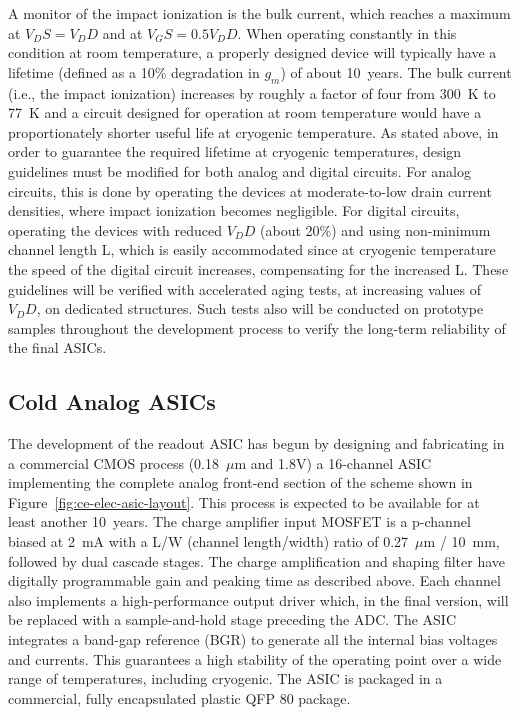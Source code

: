 A monitor of the impact ionization is the bulk current, which reaches a maximum at $V_DS = V_DD$ and at $V_GS = 0.5 V_DD$. 
When operating constantly in this condition at room temperature, a properly designed device 
will typically have a lifetime (defined as a 10\% degradation in $g_m$) of about 10~years. 
The bulk current (i.e., the impact ionization) increases by roughly a factor of four from 300~K to 77~K 
\cite{CMOS-reliability} and a circuit designed for operation at room temperature would have 
a proportionately shorter useful life at cryogenic temperature. As stated above, in order to guarantee 
the required lifetime at cryogenic temperatures, design guidelines must be modified for both analog 
and digital circuits. For analog circuits, this is done by operating the devices at moderate-to-low 
drain current densities, where impact ionization becomes negligible. For digital circuits, 
operating the devices with reduced $V_DD$ (about 20\%) and using non-minimum channel length L, 
which is easily accommodated since at cryogenic temperature the speed of the digital circuit increases, 
compensating for the increased L. These guidelines will be verified with accelerated aging tests, 
at increasing values of $V_DD$, on dedicated structures. Such tests also will be conducted on 
prototype samples throughout the development process to verify the long-term reliability of the final ASICs.

%
\subsection{Cold Analog ASICs}
\label{subsec:fe-CMOS-analog}

The development of the readout ASIC has begun by designing and fabricating in a commercial CMOS
process (0.18~$\mu$m and 1.8V) a 16-channel
ASIC implementing the complete analog front-end section of the scheme shown in Figure~\ref{fig:ce-elec-asic-layout}. 
This process is expected to be available for at least another 10~years. 
The charge amplifier input MOSFET is a p-channel biased at 2~mA with a L/W (channel length/width) ratio
of 0.27~$\mu$m / 10~mm, followed by dual cascade stages.
The charge amplification and shaping filter have
digitally programmable gain and peaking time as described above.
Each channel also implements a high-performance output driver which, in the
final version, will be replaced with a sample-and-hold stage preceding the ADC.
The ASIC integrates a band-gap reference (BGR)  to generate all the internal bias voltages and currents.
This guarantees a high stability of the operating point over a wide range of
temperatures, including cryogenic.
The ASIC is packaged in a commercial, fully encapsulated plastic QFP 80 package.

